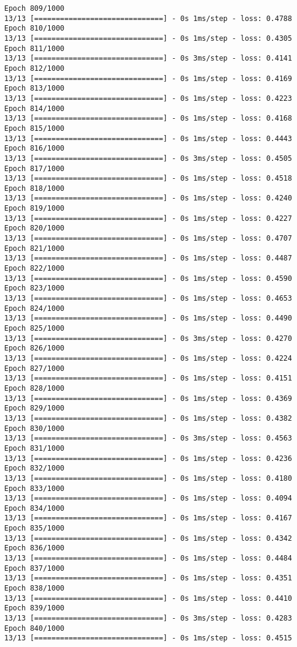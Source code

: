 \documentclass[11pt]{article}
\begin{document}
\begin{Verbatim}[commandchars=\\\{\}]
Epoch 809/1000
13/13 [==============================] - 0s 1ms/step - loss: 0.4788
Epoch 810/1000
13/13 [==============================] - 0s 1ms/step - loss: 0.4305
Epoch 811/1000
13/13 [==============================] - 0s 3ms/step - loss: 0.4141
Epoch 812/1000
13/13 [==============================] - 0s 1ms/step - loss: 0.4169
Epoch 813/1000
13/13 [==============================] - 0s 1ms/step - loss: 0.4223
Epoch 814/1000
13/13 [==============================] - 0s 1ms/step - loss: 0.4168
Epoch 815/1000
13/13 [==============================] - 0s 1ms/step - loss: 0.4443
Epoch 816/1000
13/13 [==============================] - 0s 3ms/step - loss: 0.4505
Epoch 817/1000
13/13 [==============================] - 0s 1ms/step - loss: 0.4518
Epoch 818/1000
13/13 [==============================] - 0s 1ms/step - loss: 0.4240
Epoch 819/1000
13/13 [==============================] - 0s 1ms/step - loss: 0.4227
Epoch 820/1000
13/13 [==============================] - 0s 1ms/step - loss: 0.4707
Epoch 821/1000
13/13 [==============================] - 0s 1ms/step - loss: 0.4487
Epoch 822/1000
13/13 [==============================] - 0s 1ms/step - loss: 0.4590
Epoch 823/1000
13/13 [==============================] - 0s 1ms/step - loss: 0.4653
Epoch 824/1000
13/13 [==============================] - 0s 1ms/step - loss: 0.4490
Epoch 825/1000
13/13 [==============================] - 0s 3ms/step - loss: 0.4270
Epoch 826/1000
13/13 [==============================] - 0s 1ms/step - loss: 0.4224
Epoch 827/1000
13/13 [==============================] - 0s 1ms/step - loss: 0.4151
Epoch 828/1000
13/13 [==============================] - 0s 1ms/step - loss: 0.4369
Epoch 829/1000
13/13 [==============================] - 0s 1ms/step - loss: 0.4382
Epoch 830/1000
13/13 [==============================] - 0s 3ms/step - loss: 0.4563
Epoch 831/1000
13/13 [==============================] - 0s 1ms/step - loss: 0.4236
Epoch 832/1000
13/13 [==============================] - 0s 1ms/step - loss: 0.4180
Epoch 833/1000
13/13 [==============================] - 0s 1ms/step - loss: 0.4094
Epoch 834/1000
13/13 [==============================] - 0s 1ms/step - loss: 0.4167
Epoch 835/1000
13/13 [==============================] - 0s 1ms/step - loss: 0.4342
Epoch 836/1000
13/13 [==============================] - 0s 1ms/step - loss: 0.4484
Epoch 837/1000
13/13 [==============================] - 0s 1ms/step - loss: 0.4351
Epoch 838/1000
13/13 [==============================] - 0s 1ms/step - loss: 0.4410
Epoch 839/1000
13/13 [==============================] - 0s 3ms/step - loss: 0.4283
Epoch 840/1000
13/13 [==============================] - 0s 1ms/step - loss: 0.4515

\end{Verbatim}
\end{document}
